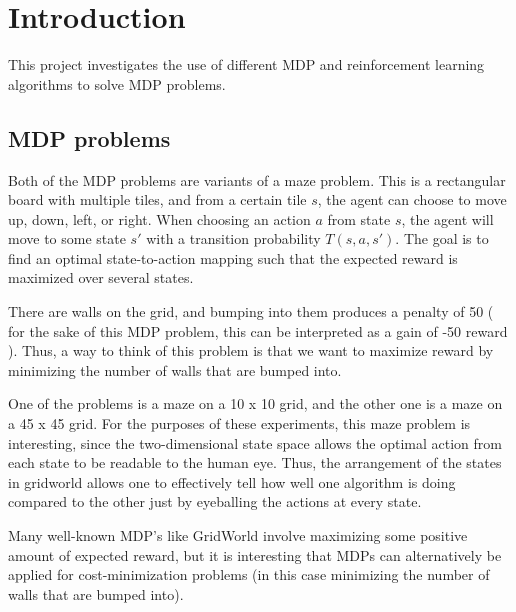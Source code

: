 \documentclass[11pt]{article}
\begin{document}
        \section{Introduction}
            
            This project investigates the use of different MDP and reinforcement learning
            algorithms to solve MDP problems.

            \subsection{MDP problems}

            Both of the MDP problems are variants of a maze problem. This is a rectangular board
            with multiple tiles, and from a certain tile $s$, the agent can choose to move
            up, down, left, or right. When choosing an action $a$ from state $s$, the agent
            will move to some state $s'$ with a transition probability $T(s, a, s')$. The
            goal is to find an optimal state-to-action mapping such that the expected reward
            is maximized over several states.

            There are walls on the grid, and bumping into them produces a penalty of 50 (
            for the sake of this MDP problem, this can be interpreted as a gain of -50
            reward
            ). Thus, a way to think of this problem is that we want to maximize reward
            by minimizing the number of walls that are bumped into.
            
            One of the problems is a maze on a 10 x 10 grid, and the other one is
            a maze on a 45 x 45 grid. For the purposes of these experiments, %
            this maze problem is interesting, since the two-dimensional state space allows the
            optimal action from each state to be readable to the human eye. Thus,
            the arrangement of the states in gridworld allows one to effectively tell
            how well one algorithm is doing compared to the other just by eyeballing the
            actions at every state.

            Many well-known MDP's like GridWorld involve maximizing some positive
            amount of expected reward, but it is interesting that MDPs can
            alternatively be applied for cost-minimization problems (in this case
            minimizing the number of walls that are bumped into).
            
            
\end{document}
